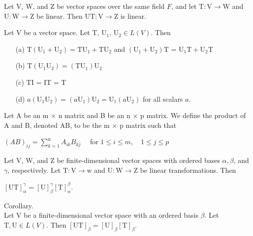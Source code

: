 \color{black}

\begin{thm*}[2.9]$ $\\
	Let V, W, and Z be vector spaces over the same field $F$, and let $\mathrm{T} : \mathrm{V} \rightarrow \mathrm{W}$ and $\mathrm{U} : \mathrm{W} \rightarrow \mathrm{Z}$ be linear. Then $\mathrm{U}\mathrm{T} : \mathrm{V} \rightarrow \mathrm{Z} $ is linear.
\end{thm*}


\begin{thm*}[2.10]$ $\\ 
	Let V be a vector space. Let T, $\mathrm{U}_1$, $\mathrm{U}_2 \in L(V)$. Then 
	\begin{enumerate}
		\item [(a)] $\mathrm{T}(\mathrm{U}_1+\mathrm{U}_2) = \mathrm{T}\mathrm{U}_1 + \mathrm{T}\mathrm{U}_2$ and $(\mathrm{U}_1 + \mathrm{U}_2)\mathrm{T}$ = $\mathrm{U}_1\mathrm{T} + \mathrm{U}_2\mathrm{T}$
		\item [(b)] $\mathrm{T}(\mathrm{U}_1\mathrm{U}_2) = (\mathrm{T}\mathrm{U}_1)\mathrm{U}_2$
		\item [(c)] TI = IT = T
		\item [(d)] $a(\mathrm{U}_1\mathrm{U}_2) = (a\mathrm{U}_1)\mathrm{U}_2 = \mathrm{U}_1(a\mathrm{U}_2)$ for all scalars $a$.
	\end{enumerate}

\end{thm*}

\begin{defn} $ $\\
	Let A be an m $\times$ n matrix and B be an n $\times$ p matrix. We define the product of A and B, denoted AB, to be the m $\times$ p matrix such that 
	\begin{center}
		$(AB)_{ij}  = \sum_{k=1}^{\mathrm{n}} A_{ik}B_{kj}$ \ \ for $1 \leq i \leq m,$\ \ $1 \leq j \leq p$ 
	\end{center}
\end{defn}

\begin{thm*}[2.11]$ $\\
	Let V, W, and Z be finite-dimensional vector spaces with ordered bases $\alpha , \beta$, and  $\gamma$, respectively. Let $\mathrm{T}: \mathrm{V} \rightarrow \mathrm{w}$ and $\mathrm{U}: \mathrm{W} \rightarrow \mathrm{Z}$ be linear transformations. Then
	\begin{center}
		$[\mathrm{U}\mathrm{T}]^\gamma_\alpha = [\mathrm{U}]^\gamma_\beta[\mathrm{T}]^\beta_\alpha$.
	\end{center}

\end{thm*}
Corollary. $ $\\
Let V be a finite-dimensional vector space with an ordered
basis $\beta$. Let $\mathrm{T}, \mathrm{U} \in L(V)$. Then $[\mathrm{U}\mathrm{T}]_\beta = [\mathrm{U}]_\beta [\mathrm{T}]_\beta$.
$ $\\

